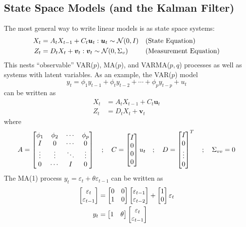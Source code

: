 \documentclass[10pt]{article}
\begin{document}
\subsection{State Space Models (and the Kalman Filter)}\label{subsec:10}

The most general way to write linear models is as state space systems:
\begin{align*}
	X_t &= A_tX_{t-1} + C_t \bm{u}_t : \bm{u}_t \sim \mathcal{N}(0,I) &&\text{(State Equation)} \\
	Z_t &= D_t X_t + \bm{v}_t : \bm{v}_t \sim \mathcal{N}(0,\Sigma_v) &&\text{(Measurement Equation)}
\end{align*}
This nests ``observable'' VAR($p$), MA($p$), and VARMA($p,q$) processes as well as systems with latent variables. As an example, the VAR($p$) model \[y_t = \phi_1 y_{t-1} + \phi_t y_{t-2} + \cdots + \phi_p y_{t-p} + u_t\]can be written as \begin{align*} X_t &= A_t X_{t-1} + C_t \bm{u}_t \\ Z_t &= D_tX_t + \bm{v}_t\end{align*}where \[A = \begin{bmatrix}\phi_1 & \phi_2 & \cdots & \phi_p \\ I & 0 & \cdots & 0 \\ \vdots & \vdots & \ddots & \vdots \\ 0 & \cdots & I & 0\end{bmatrix} \quad ; \quad C = \begin{bmatrix}I \\ 0 \\ 0 \\ 0\end{bmatrix}u_t\quad ; \quad D = \begin{bmatrix}I \\ 0 \\ \vdots \\ 0\end{bmatrix}^T \quad ; \quad \Sigma_{vv} = 0\]The MA(1) process $y_t = \varepsilon_t + \theta \varepsilon_{t-1}$ can be written as \begin{align*} \begin{bmatrix}\varepsilon_t \\ \varepsilon_{t-1}\end{bmatrix} &= \begin{bmatrix}0 & 0 \\ 1 & 0\end{bmatrix} \begin{bmatrix}\varepsilon_{t-1}\\\varepsilon_{t-2}\end{bmatrix} + \begin{bmatrix} 1 \\ 0\end{bmatrix}\varepsilon_t \\ y_t &= \begin{bmatrix}1 & \theta\end{bmatrix} \begin{bmatrix}\varepsilon_t\\\varepsilon_{t-1}\end{bmatrix} \end{align*}
\end{document}
